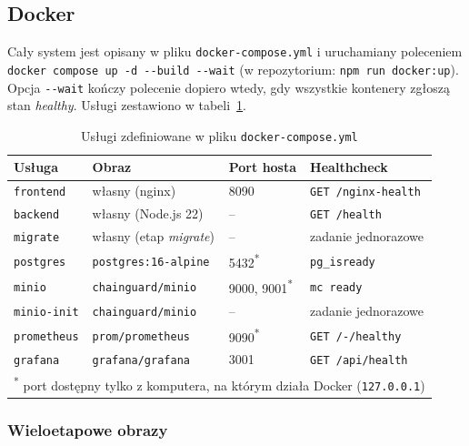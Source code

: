 \subsection{Docker}
\label{sec:docker}

Cały system jest opisany w pliku \texttt{docker-compose.yml}
i uruchamiany poleceniem \texttt{docker compose up -d -{}-build -{}-wait}
(w repozytorium: \texttt{npm run docker:up}). Opcja \texttt{-{}-wait} kończy
polecenie dopiero wtedy, gdy wszystkie kontenery zgłoszą stan \emph{healthy}.
Usługi zestawiono w tabeli~\ref{tab:uslugi}.

\begin{table}[htbp]
\centering
\caption{Usługi zdefiniowane w pliku \texttt{docker-compose.yml}}
\label{tab:uslugi}
\small
\begin{tabular}{|p{}|p{}|p{}|p{}|}
\hline
\textbf{Usługa} & \textbf{Obraz} & \textbf{Port hosta} & \textbf{Healthcheck} \\
\hline
\texttt{frontend} & własny (nginx) & 8090 & \texttt{GET /nginx-health} \\
\hline
\texttt{backend} & własny (Node.js 22) & -- & \texttt{GET /health} \\
\hline
\texttt{migrate} & własny (etap \emph{migrate}) & -- & zadanie jednorazowe \\
\hline
\texttt{postgres} & \texttt{postgres:16-alpine} & 5432\textsuperscript{*} & \texttt{pg\_isready} \\
\hline
\texttt{minio} & \texttt{chainguard/minio} & 9000, 9001\textsuperscript{*} & \texttt{mc ready} \\
\hline
\texttt{minio-init} & \texttt{chainguard/minio} & -- & zadanie jednorazowe \\
\hline
\texttt{prometheus} & \texttt{prom/prometheus} & 9090\textsuperscript{*} & \texttt{GET /-/healthy} \\
\hline
\texttt{grafana} & \texttt{grafana/grafana} & 3001 & \texttt{GET /api/health} \\
\hline
\multicolumn{4}{|l|}{\textsuperscript{*} port dostępny tylko z komputera, na którym działa Docker (\texttt{127.0.0.1})} \\
\hline
\end{tabular}
\par
{}
\end{table}

\subsubsection{Wieloetapowe obrazy}

